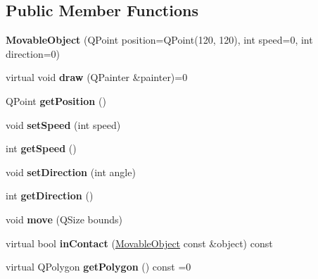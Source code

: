 \subsection*{Public Member Functions}
\begin{DoxyCompactItemize}
\item 
\hypertarget{classMovableObject_a9b2b8fc00404965484a7885fd207da24}{{\bfseries Movable\-Object} (Q\-Point position=Q\-Point(120, 120), int speed=0, int direction=0)}\label{classMovableObject_a9b2b8fc00404965484a7885fd207da24}

\item 
\hypertarget{classMovableObject_a7112d6aedca3f9e2a2cfa3d6735a714e}{virtual void {\bfseries draw} (Q\-Painter \&painter)=0}\label{classMovableObject_a7112d6aedca3f9e2a2cfa3d6735a714e}

\item 
\hypertarget{classMovableObject_a574fbfa8b20e5a4d40e57346882e48b0}{Q\-Point {\bfseries get\-Position} ()}\label{classMovableObject_a574fbfa8b20e5a4d40e57346882e48b0}

\item 
\hypertarget{classMovableObject_a31182609e87fb111c14eaf95adf18530}{void {\bfseries set\-Speed} (int speed)}\label{classMovableObject_a31182609e87fb111c14eaf95adf18530}

\item 
\hypertarget{classMovableObject_a8cccf8afb9b7bfef062b24e8ecf768ad}{int {\bfseries get\-Speed} ()}\label{classMovableObject_a8cccf8afb9b7bfef062b24e8ecf768ad}

\item 
\hypertarget{classMovableObject_a98eaac3597cd98d7c0072448fceefe42}{void {\bfseries set\-Direction} (int angle)}\label{classMovableObject_a98eaac3597cd98d7c0072448fceefe42}

\item 
\hypertarget{classMovableObject_a874e1be122655380b1b0fa94e8100298}{int {\bfseries get\-Direction} ()}\label{classMovableObject_a874e1be122655380b1b0fa94e8100298}

\item 
\hypertarget{classMovableObject_a4f110e42ed00a673b7b6d9f453f75c8e}{void {\bfseries move} (Q\-Size bounds)}\label{classMovableObject_a4f110e42ed00a673b7b6d9f453f75c8e}

\item 
\hypertarget{classMovableObject_a468258e6606987d94bb56a7c193d6f23}{virtual bool {\bfseries in\-Contact} (\hyperlink{classMovableObject}{Movable\-Object} const \&object) const }\label{classMovableObject_a468258e6606987d94bb56a7c193d6f23}

\item 
\hypertarget{classMovableObject_af49dab7d8966f5cebb7adcda2f74cc25}{virtual Q\-Polygon {\bfseries get\-Polygon} () const =0}\label{classMovableObject_af49dab7d8966f5cebb7adcda2f74cc25}

\end{DoxyCompactItemize}
